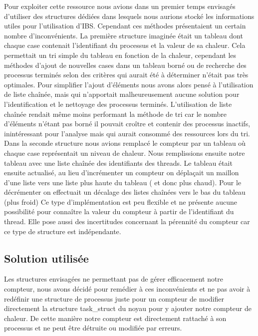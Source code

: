       Pour exploiter cette ressource nous avions dans un premier temps envisagés
      d'utiliser des structures dédiées dans lesquels nous aurions stocké les
      informations utiles pour l'utilisation d'IBS. Cependant ces méthodes
      présentaient un certain nombre d'inconvénients.  La première structure
      imaginée était un tableau dont chaque case contenait l'identifiant du
      processus et la valeur de sa chaleur. Cela permettait un tri simple du
      tableau en fonction de la chaleur, cependant les méthodes d'ajout de
      nouvelles cases dans un tableau borné ou de recherche des processus
      terminés selon des critères qui aurait été à déterminer n'était pas très
      optimales.  Pour simplifier l'ajout d'éléments nous avons alors pensé à
      l'utilisation de liste chaînée, mais qui n'apportait malheureusement
      aucune solution pour l'identification et le nettoyage des processus
      terminés. L'utilisation de liste chaînée rendait même moins performant la
      méthode de tri car le nombre d'éléments n'étant pas borné il pouvait
      croître et contenir des processus inactifs, inintéressant pour l'analyse
      mais qui aurait consommé des ressources lors du tri.  Dans la seconde
      structure nous avions remplacé le compteur par un tableau où chaque case
      représentait un niveau de chaleur. Nous remplissions ensuite notre tableau
      avec une liste chaînée des identifiants des threads. Le tableau était
      ensuite actualisé, au lieu d'incrémenter un compteur on déplaçait un
      maillon d'une liste vers une liste plus haute du tableau ( et donc plus
      chaud). Pour le décrémenter on effectuait un décalage des listes chaînées
      vers le bas du tableau (plus froid) Ce type d'implémentation est peu
      flexible et ne présente aucune possibilité pour connaître la valeur du
      compteur à partir de l'identifiant du thread. Elle pose aussi des
      incertitudes concernant la pérennité du compteur car ce type de structure
      est indépendante.

    \subsection{Solution utilisée}

      Les structures envisagées ne permettant pas de gérer efficacement notre
      compteur, nous avons décidé pour remédier à ces inconvénients et ne pas
      avoir à redéfinir une structure de processus juste pour un compteur de
      modifier directement la structure task\_struct du noyau pour y ajouter
      notre compteur de chaleur. De cette manière notre compteur est directement
      rattaché à son processus et ne peut être détruite ou modifiée par erreurs.


